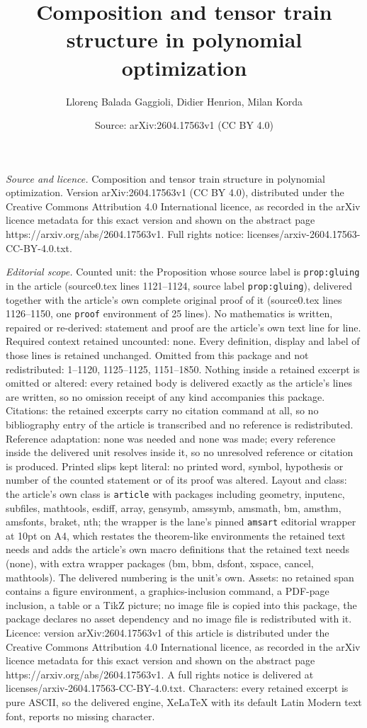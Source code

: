 \documentclass[10pt,a4paper]{amsart}
\title[Composition and tensor train structure in polynomial optimiz]{Composition and tensor train structure in polynomial optimization}
\author{Lloren\c{c} Balada Gaggioli, Didier Henrion, Milan Korda}
\date{Source: arXiv:2604.17563v1 (CC BY 4.0)}
\begin{document}
\maketitle

\noindent\emph{Source and licence.} Composition and tensor train structure in polynomial optimization. Version arXiv:2604.17563v1 (CC BY 4.0), distributed under the Creative Commons Attribution 4.0 International licence, as recorded in the arXiv licence metadata for this exact version and shown on the abstract page https://arxiv.org/abs/2604.17563v1. Full rights notice: licenses/arxiv-2604.17563-CC-BY-4.0.txt.\par\smallskip

\noindent\textit{Editorial scope.} Counted unit: the Proposition whose source label is \texttt{prop:gluing} in the article (source0.tex lines 1121--1124, source label \texttt{prop:gluing}), delivered together with the article's own complete original proof of it (source0.tex lines 1126--1150, one \texttt{proof} environment of 25 lines). No mathematics is written, repaired or re-derived: statement and proof are the article's own text line for line. Required context retained uncounted: none. Every definition, display and label of those lines is retained unchanged. Omitted from this package and not redistributed: 1--1120, 1125--1125, 1151--1850. Nothing inside a retained excerpt is omitted or altered: every retained body is delivered exactly as the article's lines are written, so no omission receipt of any kind accompanies this package. Citations: the retained excerpts carry no citation command at all, so no bibliography entry of the article is transcribed and no reference is redistributed. Reference adaptation: none was needed and none was made; every reference inside the delivered unit resolves inside it, so no unresolved reference or citation is produced. Printed slips kept literal: no printed word, symbol, hypothesis or number of the counted statement or of its proof was altered. Layout and class: the article's own class is \texttt{article} with packages including geometry, inputenc, subfiles, mathtools, esdiff, array, gensymb, amssymb, amsmath, bm, amsthm, amsfonts, braket, nth; the wrapper is the lane's pinned \texttt{amsart} editorial wrapper at 10pt on A4, which restates the theorem-like environments the retained text needs and adds the article's own macro definitions that the retained text needs (none), with extra wrapper packages (bm, bbm, dsfont, xspace, cancel, mathtools). The delivered numbering is the unit's own. Assets: no retained span contains a figure environment, a graphics-inclusion command, a PDF-page inclusion, a table or a TikZ picture; no image file is copied into this package, the package declares no asset dependency and no image file is redistributed with it. Licence: version arXiv:2604.17563v1 of this article is distributed under the Creative Commons Attribution 4.0 International licence, as recorded in the arXiv licence metadata for this exact version and shown on the abstract page https://arxiv.org/abs/2604.17563v1. A full rights notice is delivered at licenses/arxiv-2604.17563-CC-BY-4.0.txt. Characters: every retained excerpt is pure ASCII, so the delivered engine, XeLaTeX with its default Latin Modern text font, reports no missing character.
\end{document}
